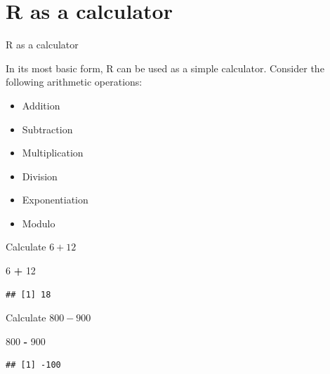 \documentclass[
  ignorenonframetext,
]{beamer}
\newenvironment{Shaded}{\begin{snugshade}}{\end{snugshade}}
\newcommand{\DecValTok}[1]{\textcolor[rgb]{0.00,0.00,0.81}{#1}}
\newcommand{\OperatorTok}[1]{\textcolor[rgb]{0.81,0.36,0.00}{\textbf{#1}}}
\newcommand{\StringTok}[1]{\textcolor[rgb]{0.31,0.60,0.02}{#1}}
\providecommand{\tightlist}{%
  \setlength{\itemsep}{0pt}\setlength{\parskip}{0pt}}
\begin{document}
\section{R as a calculator}
\begin{frame}[fragile]{R as a calculator}
\protect\hypertarget{r-as-a-calculator}{}

In its most basic form, R can be used as a simple calculator. Consider
the following arithmetic operations:

\begin{itemize}
\tightlist
\item
  Addition 
\item
  Subtraction 
\item
  Multiplication 
\item
  Division 
\item
  Exponentiation
\item
  Modulo 
\end{itemize}

Calculate \(6 + 12\)

\begin{Shaded}
\begin{Highlighting}[]
\DecValTok{6} \OperatorTok{+}\StringTok{ }\DecValTok{12}
\end{Highlighting}
\end{Shaded}

\begin{verbatim}
## [1] 18
\end{verbatim}

Calculate \(800-900\)

\begin{Shaded}
\begin{Highlighting}[]
\DecValTok{800} \OperatorTok{-}\StringTok{ }\DecValTok{900}
\end{Highlighting}
\end{Shaded}

\begin{verbatim}
## [1] -100
\end{verbatim}

\end{frame}
\end{document}

